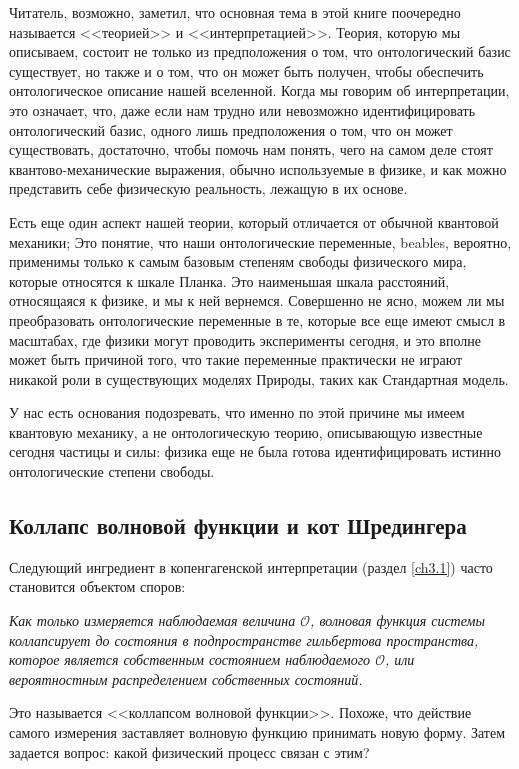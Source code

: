 \documentclass[main.tex]{subfiles}
\begin{document}
Читатель, возможно, заметил, что основная тема в этой книге поочередно называется <<теорией>> и <<интерпретацией>>. Теория, которую мы описываем, состоит не только из предположения о том, что онтологический базис существует, но также и о том, что он может быть получен, чтобы обеспечить онтологическое описание нашей вселенной. Когда мы говорим об интерпретации, это означает, что, даже если нам трудно или невозможно идентифицировать онтологический базис, одного лишь предположения о том, что он может существовать, достаточно, чтобы помочь нам понять, чего на самом деле стоят квантово-механические выражения, обычно используемые в физике, и как можно представить себе физическую реальность, лежащую в их основе.

Есть еще один аспект нашей теории, который отличается от обычной квантовой механики; Это понятие, что наши онтологические переменные, beables, вероятно, применимы только к самым базовым степеням свободы физического мира, которые относятся к шкале Планка. Это наименьшая шкала расстояний, относящаяся к физике, и мы к ней вернемся. Совершенно не ясно, можем ли мы преобразовать онтологические переменные в те, которые все еще имеют смысл в масштабах, где физики могут проводить эксперименты сегодня, и это вполне может быть причиной того, что такие переменные практически не играют никакой роли в существующих моделях Природы, таких как Стандартная модель.

У нас есть основания подозревать, что именно по этой причине мы имеем квантовую механику, а не онтологическую теорию, описывающую известные сегодня частицы и силы: физика еще не была готова идентифицировать истинно онтологические степени свободы.

\subsection{Коллапс волновой функции и кот Шредингера}\label{ch3.4}

Следующий ингредиент в копенгагенской интерпретации (раздел \ref{ch3.1}) часто становится объектом споров:

\textit{Как только измеряется наблюдаемая величина $\mathcal O$, волновая функция системы коллапсирует до состояния в подпространстве гильбертова пространства, которое является собственным состоянием наблюдаемого $\mathcal O$, или вероятностным распределением собственных состояний.}

Это называется <<коллапсом волновой функции>>. Похоже, что действие самого измерения заставляет волновую функцию принимать новую форму. Затем задается вопрос: какой физический процесс связан с этим?
\end{document}
